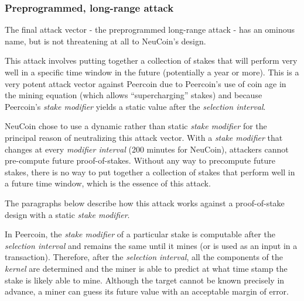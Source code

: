 \documentclass[a4paper,11pt]{article}
\begin{document}
\subsubsection{Preprogrammed, long-range attack}
\label{334}

The final attack vector - the preprogrammed long-range attack - has an ominous name, but is not threatening at all to NeuCoin's design.

This attack involves putting together a collection of stakes that will perform very well in a specific time window in the future (potentially a year or more). This is a very potent attack vector against Peercoin due to Peercoin's use of coin age in the mining equation (which allows ``supercharging'' stakes) and because Peercoin's \textit{stake modifier} yields a static value after the \textit{selection interval}. 

NeuCoin chose to use a dynamic rather than static \textit{stake modifier} for the principal reason of neutralizing this attack vector. With a \textit{stake modifier} that changes at every \textit{modifier interval} (200 minutes for NeuCoin), attackers cannot pre-compute future proof-of-stakes. Without any way to precompute future stakes, there is no way to put together a collection of stakes that perform well in a future time window, which is the essence of this attack.

The paragraphs below describe how this attack works against a proof-of-stake design with a static \textit{stake modifier}. 

In Peercoin, the \textit{stake modifier} of a particular stake is computable after the \textit{selection interval} and remains the same until it mines (or is used as an input in a transaction). Therefore, after the \textit{selection interval}, all the components of the \textit{kernel} are determined and the miner is able to predict at what time stamp the stake is likely able to mine. Although the target cannot be known precisely in advance, a miner can guess its future value with an acceptable margin of error.
\end{document}
